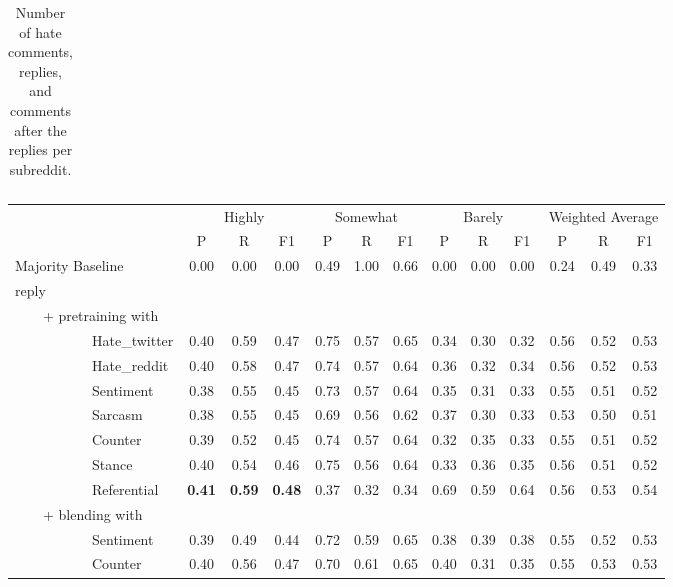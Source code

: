\documentclass[11pt]{article}
\begin{document}
\begin{table}[ht!]
\begin{tabular}{lrrr}
		\end{tabular}
		\caption{Number of hate comments, replies, and comments after the replies per subreddit.}
		\label{t:subreddits}
	\end{table}
	
	
	
	\begin{table*}
		\small
		\centering
		\setlength{\tabcolsep}{.07in}
		\begin{tabular}{l ccc ccc ccc ccc}
			\toprule
			\multicolumn{1}{c}{} & \multicolumn{3}{c}{Highly} & \multicolumn{3}{c}{Somewhat} & \multicolumn{3}{c}{Barely} & \multicolumn{3}{c}{Weighted Average} \\
			\cmidrule(lr){2-4} \cmidrule(lr){5-7} \cmidrule(lr){8-10} \cmidrule(lr){11-13} 
			& P & R & F1 & P & R & F1 & P & R & F1 & P & R & F1 \\
			\hline \addlinespace 
			Majority Baseline & 0.00 & 0.00 & 0.00 & 0.49 & 1.00 & 0.66 & 0.00 & 0.00 & 0.00 & 0.24 & 0.49 & 0.33 \\		
			reply\\
			~~~~+ pretraining with \\
			~~~~~~~~~~~Hate\_twitter & 0.40 & 0.59	& 0.47  & 0.75 & 0.57	& 0.65	& 0.34	& 0.30 & 0.32 & 0.56	& 0.52	& 0.53\\
			~~~~~~~~~~~Hate\_reddit & 0.40 & 0.58	& 0.47	& 0.74 &	0.57 &	0.64 & 0.36	& 0.32	& 0.34  &	0.56 &	0.52 &	0.53\\
			~~~~~~~~~~~Sentiment & 0.38 & 0.55	& 0.45	&	0.73 &	0.57 &	0.64 & 0.35 & 0.31 &	0.33  &	0.55 &	0.51 &	0.52\\
			~~~~~~~~~~~Sarcasm & 0.38 & 0.55 &	0.45 &	0.69 &	0.56 &	0.62 &	0.37 &	0.30 &	0.33  &	0.53 &	0.50 &	0.51\\
			~~~~~~~~~~~Counter & 0.39 & 0.52 &	0.45 &	0.74 &	0.57 &	0.64 &	0.32 &	0.35 &	0.33  & 	0.55 &	0.51 &	0.52\\
			~~~~~~~~~~~Stance & 0.40 &	0.54 &	0.46 &	0.75 &	0.56 &	0.64 &	0.33 &	0.36 &	0.35  &	0.56 &	0.51 &	0.52\\
			~~~~~~~~~~~Referential &\textbf{ 0.41 }& \textbf{0.59} & \textbf{0.48} & 0.37 & 0.32 & 0.34 & 0.69 & 0.59 & 0.64 & 0.56 & 0.53 & 0.54\\ 
			~~~~+ blending with\\
			~~~~~~~~~~~Sentiment & 0.39 & 0.49 & 0.44 &	0.72 &	0.59 &	0.65 & 0.38 &	0.39 &	0.38  &	0.55 &	0.52 &	0.53\\
			~~~~~~~~~~~Counter & 0.40  & 0.56 & 0.47 &	0.70 &	0.61 &	0.65  &	0.40 & 0.31 &	0.35 &	0.55 &	0.53 &	0.53\\

\end{tabular}
\end{table*}
\end{document}
